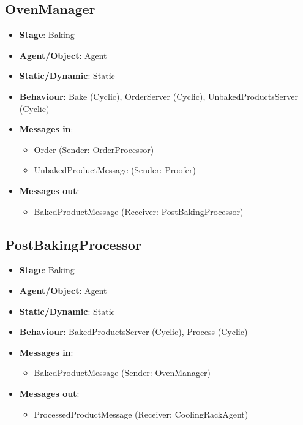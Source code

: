 \documentclass[12pt]{article}
\begin{document}
\subsection{OvenManager}
\begin{itemize}
    \item \textbf{Stage}: Baking 
    \item \textbf{Agent/Object}: Agent 
    \item \textbf{Static/Dynamic}: Static
    \item \textbf{Behaviour}: Bake (Cyclic), OrderServer (Cyclic), UnbakedProductsServer (Cyclic) 
    \item \textbf{Messages in}:
        \begin{itemize}
            \item  Order (Sender: OrderProcessor)
            \item  UnbakedProductMessage (Sender: Proofer)
        \end{itemize}
    \item \textbf{Messages out}:
        \begin{itemize}
            \item  BakedProductMessage (Receiver: PostBakingProcessor)
        \end{itemize}
\end{itemize}
\newpage{}

\subsection{PostBakingProcessor}
\begin{itemize}
    \item \textbf{Stage}: Baking
    \item \textbf{Agent/Object}: Agent 
    \item \textbf{Static/Dynamic}: Static
    \item \textbf{Behaviour}: BakedProductsServer (Cyclic), Process (Cyclic)
    \item \textbf{Messages in}:
        \begin{itemize}
            \item  BakedProductMessage (Sender: OvenManager)
        \end{itemize}
    \item \textbf{Messages out}:
        \begin{itemize}
            \item  ProcessedProductMessage (Receiver: CoolingRackAgent)
        \end{itemize}
\end{itemize}
\newpage{}
\end{document}
